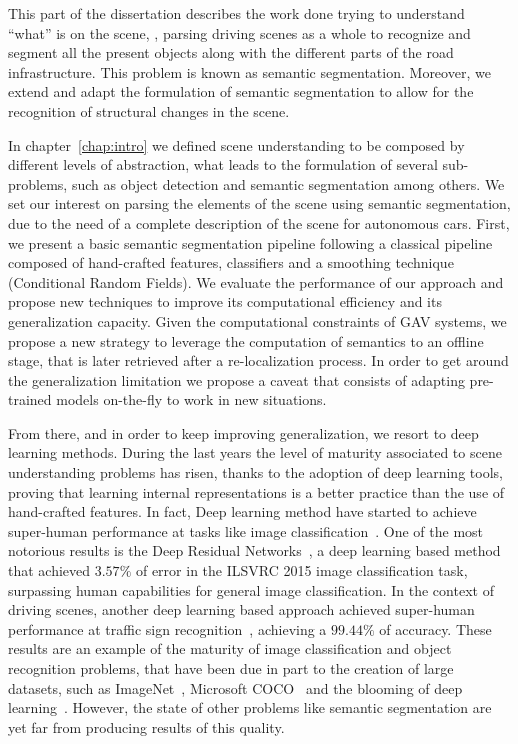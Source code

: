 This part of the dissertation describes the work done trying to understand ``what'' is on the scene, \ie, parsing driving scenes as a whole to recognize and segment all the present objects along with the different parts of the road infrastructure.  This problem is known as semantic segmentation. Moreover, we extend and adapt the formulation of semantic segmentation to allow for the recognition of structural changes in the scene. 

In chapter~\ref{chap:intro} we defined scene understanding to be composed by different levels of abstraction, what leads to the formulation of several sub-problems, such as object detection and semantic segmentation among others. We set our interest on parsing the elements of the scene using semantic segmentation, due to the need of a complete description of the scene for autonomous cars. First, we present a basic semantic segmentation pipeline following a classical pipeline composed of hand-crafted features, classifiers and a smoothing technique (Conditional Random Fields). We evaluate the performance of our approach and propose new techniques to improve its computational efficiency and its generalization capacity. Given the computational constraints of GAV systems, we propose a new strategy to leverage the computation of semantics to an offline stage, that is later retrieved after a re-localization process. In order to get around the generalization limitation we propose a caveat that consists of adapting pre-trained models on-the-fly to work in new situations.

From there, and in order to keep improving generalization, we resort to deep learning methods. During the last years the level of maturity associated to scene understanding problems has risen, thanks to the adoption of deep learning tools, proving that learning internal representations is a better practice than the use of hand-crafted features. In fact, Deep learning method have started to achieve super-human performance at tasks like image classification~\cite{He15iccv}. One of the most notorious results is the Deep Residual Networks~\cite{HeICCV15Delving}, a deep learning based method that achieved $3.57\%$ of error in the ILSVRC 2015 image classification task, surpassing human capabilities for general image classification. In the context of driving scenes, another deep learning based approach achieved super-human performance at traffic sign recognition~\cite{Houben-IJCNN-2013}, achieving a $99.44\%$ of accuracy. These results are an example of the maturity of image classification and object recognition problems, that have been due in part to the creation of large datasets, such as ImageNet~\cite{imagenet_cvpr09}, Microsoft COCO~\cite{Lin14eccv} and the blooming of deep learning~\cite{NIPS2012_4824}. However, the state of other problems like semantic segmentation are yet far from producing results of this quality. 


